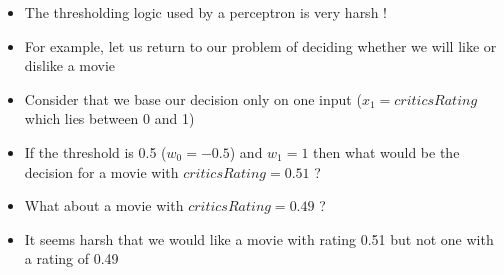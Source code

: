 \documentclass[aspectratio=169]{beamer}
\begin{document}
\begin{frame}
\begin{columns}
\begin{overlayarea}{\textwidth}{\textheight}
\begin{itemize}
\item<1-> The thresholding logic used by a perceptron is very harsh !
\item<2-> For example, let us return to our problem of deciding whether we will like or dislike a movie
\item<3-> Consider that we base our decision only on one input ($x_1 = criticsRating$ which lies between 0 and 1)
\item<4-> If the threshold is 0.5 ($w_0 = -0.5$) and $w_1 = 1$ then what would be the decision for a movie with $criticsRating=0.51$ ? 
\item<6-> What about a movie with $criticsRating=0.49$ ? 
\item<8-> It seems harsh that we would like a movie with rating 0.51 but not one with a rating of 0.49
\end{itemize}
\end{overlayarea}
\end{columns}
\end{frame}
\end{document}
